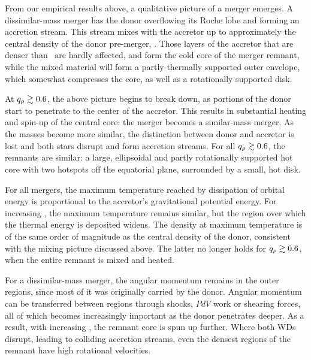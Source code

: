 From our empirical results above, a qualitative picture of a merger emerges.  A dissimilar-mass merger has the donor overflowing its Roche lobe and forming an accretion stream.  This stream mixes with the accretor up to approximately the central density of the donor pre-merger, \rhocd.  Those layers of the accretor that are denser than \rhocd\ are hardly affected, and form the cold core of the merger remnant, while the mixed material will form a partly-thermally supported outer envelope, which somewhat compresses the core, as well as a rotationally supported disk.

At $\qrho\gtrsim0.6$, the above picture begins to break down, as portions of the donor start to penetrate to the center of the accretor.  This results in substantial heating and spin-up of the central core: the merger becomes a similar-mass merger.  As the masses become more similar, the distinction between donor and accretor is lost and both stars disrupt and form accretion streams.  For all $\qrho\gtrsim0.6$, the remnants are similar: a large, ellipsoidal and partly rotationally supported hot core with two hotspots off the equatorial plane, surrounded by a small, hot disk.

For all mergers, the maximum temperature reached by dissipation of orbital energy is proportional to the accretor's gravitational potential energy.  For increasing \qrho, the maximum temperature remains similar, but the region over which the thermal energy is deposited widens.  The density at maximum temperature is of the same order of magnitude as the central density of the donor, consistent with the mixing picture discussed above.  The latter no longer holds for $\qrho\gtrsim0.6$, when the entire remnant is mixed and heated.

For a dissimilar-mass merger, the angular momentum remains in the outer regions, since most of it was originally carried by the donor.  Angular momentum can be transferred between regions through shocks, $PdV$ work or shearing forces, all of which becomes increasingly important as the donor penetrates deeper.  As a result, with increasing \qrho, the remnant core is spun up further.  Where both WDs disrupt, leading to colliding accretion streams, even the densest regions of the remnant have high rotational velocities.


